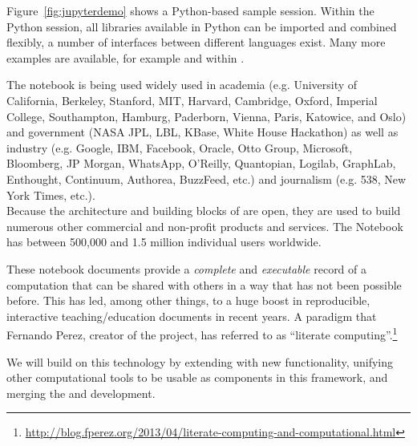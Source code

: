 Figure~\ref{fig:jupyterdemo} shows a Python-based sample
session. Within the Python session, all libraries available in Python
can be imported and combined flexibly, a number of interfaces between
different languages exist. Many more examples are available, for
example \cite{IPython-demo-hyperbolic-conservation-laws} and
within \cite{IPython-sload-foundation-report-2013}.

The \Jupyter notebook is being used widely used in academia
(e.g. University of California, Berkeley, Stanford,
MIT, Harvard, Cambridge, Oxford, Imperial College, Southampton,
Hamburg, Paderborn, Vienna, Paris, Katowice, and Oslo) and government
(NASA JPL, LBL, KBase, White House Hackathon) as well as
industry (e.g. Google, IBM, Facebook, Oracle, Otto Group, Microsoft,
Bloomberg, JP Morgan, WhatsApp, O’Reilly, Quantopian, Logilab,
GraphLab, Enthought, Continuum, Authorea, BuzzFeed, etc.)  and
journalism (e.g. 538, New York Times, etc.). \\
%
Because the architecture and building blocks of \Jupyter are open,
they are used to build numerous other commercial and non-profit
products and services. The \Jupyter Notebook has between 500,000 and
1.5 million individual users worldwide.

These notebook documents provide a \emph{complete} and
\emph{executable} record of a computation that can be shared with
others in a way that has not been possible before. This has led, among
other things, to a huge boost in reproducible, interactive
teaching/education documents in recent years. A paradigm that Fernando Perez, creator of the project, has referred to as ``literate computing''.\footnote{\url{http://blog.fperez.org/2013/04/literate-computing-and-computational.html}}

We will build on this technology by extending \Jupyter with new
functionality, unifying other computational tools to be usable as
components in this framework, and merging the \Sage and \Jupyter
development.  



